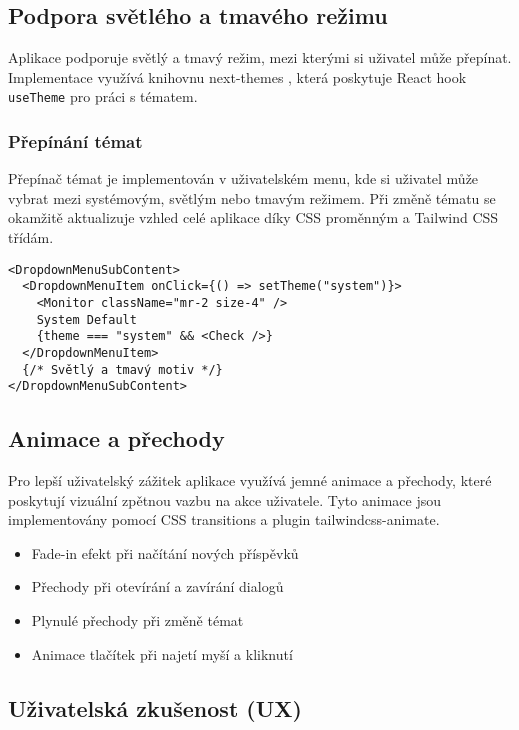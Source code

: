 \documentclass[12pt]{article}
\begin{document}
\subsection{Podpora světlého a tmavého režimu}

Aplikace podporuje světlý a tmavý režim, mezi kterými si uživatel může přepínat. Implementace využívá knihovnu next-themes \citep{NextThemes}, která poskytuje React hook \texttt{useTheme} pro práci s tématem.

\subsubsection{Přepínání témat}
Přepínač témat je implementován v uživatelském menu, kde si uživatel může vybrat mezi systémovým, světlým nebo tmavým režimem. Při změně tématu se okamžitě aktualizuje vzhled celé aplikace díky CSS proměnným a Tailwind CSS třídám.

\begin{lstlisting}[style=typescript]
<DropdownMenuSubContent>
  <DropdownMenuItem onClick={() => setTheme("system")}>
    <Monitor className="mr-2 size-4" />
    System Default
    {theme === "system" && <Check />}
  </DropdownMenuItem>
  {/* Světlý a tmavý motiv */}
</DropdownMenuSubContent>

\end{lstlisting}

\subsection{Animace a přechody}

Pro lepší uživatelský zážitek aplikace využívá jemné animace a přechody, které poskytují vizuální zpětnou vazbu na akce uživatele. Tyto animace jsou implementovány pomocí CSS transitions a plugin tailwindcss-animate.

\begin{itemize}
    \item Fade-in efekt při načítání nových příspěvků
    \item Přechody při otevírání a zavírání dialogů
    \item Plynulé přechody při změně témat
    \item Animace tlačítek při najetí myší a kliknutí
\end{itemize}

\subsection{Uživatelská zkušenost (UX)}
\end{document}
